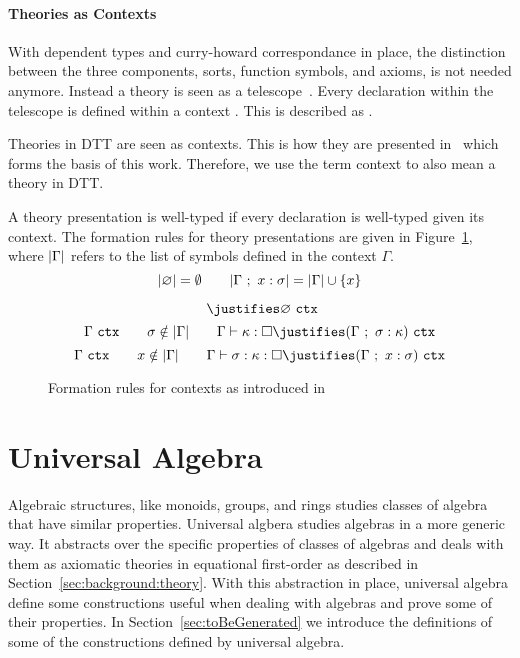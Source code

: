 \paragraph{Theories as Contexts}
With dependent types and curry-howard correspondance in place, the distinction between the three components, sorts, function symbols, and axioms, is not needed anymore. Instead a theory is seen as a telescope~\cite{de1991telescopic}. 
Every declaration  within the telescope is defined within a context \lstmath{$\Gamma$}. This is described as . 

Theories in DTT are seen as contexts. This is how they are presented in~\cite{carette2018building} which forms the basis of this work. Therefore, we use the term context to also mean a theory in DTT. 

A theory presentation is well-typed if every declaration  is well-typed given its context. The formation rules for theory presentations are given in Figure~\ref{fig:ctx}, where $| \Gamma |$ refers to the list of symbols defined in the context $\Gamma$. 
$$ | \varnothing | = \emptyset \qquad
| \Gamma\ ;\ x : \sigma | = | \Gamma | \cup \left\{ x \right\}
$$
\begin{figure}[ht]
    \begin{proofrules}
        \[ \ \justifies \varnothing \ \wfctx \]
        \[ \context{\Gamma}\ \wfctx \qquad \sigma \notin \syms{\context{\Gamma}}
        \qquad \context{\Gamma} \vdash \kappa : \Box \justifies
        (\context{\Gamma}\ ;\ \sigma : \kappa)\ \wfctx \]
        \[ \context{\Gamma}\ \wfctx \qquad x\notin \syms{\context{\Gamma}}
        \qquad \context{\Gamma} \vdash \sigma : \kappa : \Box \justifies
        (\context{\Gamma}\ ;\ x : \sigma)\ \wfctx \]
    \end{proofrules}
    \caption{Formation rules for contexts as introduced in~\cite{carette2018building}}
    \label{fig:ctx}
\end{figure}

\section{Universal Algebra}
\label{sec:background:ualgebra}
Algebraic structures, like monoids, groups, and rings studies classes of algebra that have similar properties. Universal algbera studies algebras in a more generic way. It abstracts over the specific properties of classes of algebras and deals with them as axiomatic theories in equational first-order as described in Section~\ref{sec:background:theory}. With this abstraction in place, universal algebra define some constructions useful when dealing with algebras and prove some of their properties. In Section~\ref{sec:toBeGenerated} we introduce the definitions of some of the constructions defined by universal algebra. 


